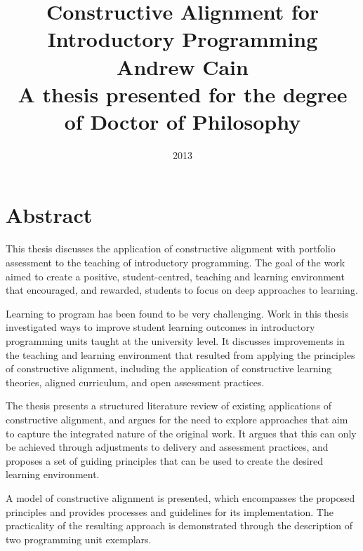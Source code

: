 
\title{ \huge{\textbf{Constructive Alignment for Introductory Programming}} \\[1.2cm]
\vspace{2.2cm} 
\Large{\textbf{Andrew Cain}} \\[1.2cm]
\vspace{2cm}
\large{A thesis presented for the degree of Doctor of Philosophy} \\
\vspace{2.5cm} 
} 

\date{2013}

\maketitle

\chapter*{Abstract}

This thesis discusses the application of constructive alignment with portfolio assessment to the teaching of introductory programming. The goal of the work aimed to create a positive, student-centred, teaching and learning environment that encouraged, and rewarded, students to focus on deep approaches to learning.

Learning to program has been found to be very challenging. Work in this thesis investigated ways to improve student learning outcomes in introductory programming units taught at the university level. It discusses improvements in the teaching and learning environment that resulted from applying the principles of constructive alignment, including the application of constructive learning theories, aligned curriculum, and open assessment practices. 

The thesis presents a structured literature review of existing applications of constructive alignment, and argues for the need to explore approaches that aim to capture the integrated nature of the original work. It argues that this can only be achieved through adjustments to delivery and assessment practices, and proposes a set of guiding principles that can be used to create the desired learning environment.

A model of constructive alignment is presented, which encompasses the proposed principles and provides processes and guidelines for its implementation. The practicality of the resulting approach is demonstrated through the description of two programming unit exemplars.

